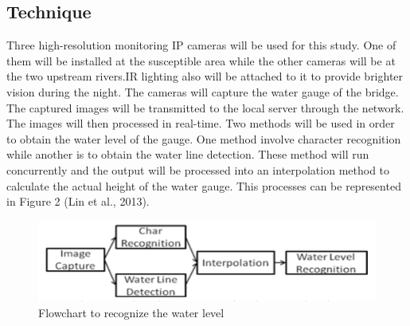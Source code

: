 \documentclass[12pt,a4paper,openany]{report}
\begin{document}
\subsection{Technique}
Three high-resolution monitoring IP cameras will be used for this study. One of them will be installed at the susceptible area while the other cameras will be at the two upstream rivers.IR lighting also will be attached to it to provide brighter vision during the night. The cameras will capture the water gauge of the bridge. The captured images will be transmitted to the local server through the network. The images will then processed in real-time. Two methods will be used in order to obtain the water level of the gauge. One method involve character recognition while another is to obtain the water line detection. These method will run concurrently and the output will be processed into an interpolation method to calculate the actual height of the water gauge. This processes can be represented in Figure 2 (Lin et al., 2013).
\begin{figure}[H]
\centering
\includegraphics[scale=0.8]{./images/WaterLvl}
\caption {Flowchart to recognize the water level}
\end{figure}
\end{document}
